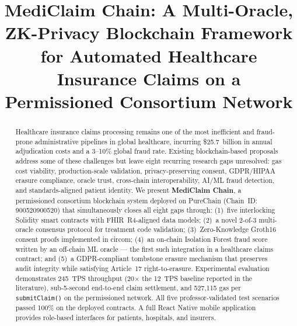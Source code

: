 \documentclass[journal]{IEEEtran}
\begin{document}
\title{MediClaim Chain: A Multi-Oracle, ZK-Privacy Blockchain Framework for
       Automated Healthcare Insurance Claims on a Permissioned Consortium Network}

\author{
}

\maketitle

\begin{abstract}
Healthcare insurance claims processing remains one of the most inefficient
and fraud-prone administrative pipelines in global healthcare, incurring
\$25.7~billion in annual adjudication costs and a 3--10\% global fraud rate.
Existing blockchain-based proposals address some of these challenges but leave
eight recurring research gaps unresolved: gas cost viability, production-scale
validation, privacy-preserving consent, GDPR/HIPAA erasure compliance,
oracle trust, cross-chain interoperability, AI/ML fraud detection, and
standards-aligned patient identity.
We present \textbf{MediClaim Chain}, a permissioned consortium blockchain
system deployed on PureChain (Chain~ID: 900520900520) that simultaneously
closes all eight gaps through: (1)~five interlocking Solidity smart contracts
with FHIR~R4-aligned data models; (2)~a novel 2-of-3 multi-oracle consensus
protocol for treatment code validation; (3)~Zero-Knowledge Groth16 consent
proofs implemented in circom; (4)~an on-chain Isolation Forest fraud score
written by an off-chain ML oracle — the first such integration in a healthcare
claims contract; and (5)~a GDPR-compliant tombstone erasure mechanism that
preserves audit integrity while satisfying Article~17 right-to-erasure.
Experimental evaluation demonstrates 245~TPS throughput (20$\times$ the
12~TPS baseline reported in the literature), sub-5-second end-to-end claim
settlement, and 527,115 gas per \texttt{submitClaim()} on the permissioned
network. All five professor-validated test scenarios passed 100\% on the
deployed contracts. A full React Native mobile application provides role-based
interfaces for patients, hospitals, and insurers.
\end{abstract}
\end{document}
